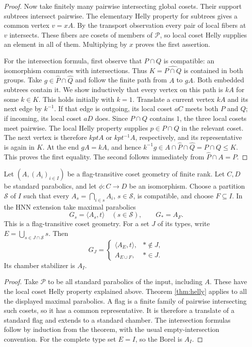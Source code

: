 \begin{proof}
Now take finitely many pairwise intersecting global cosets. Their support
subtrees intersect pairwise. The elementary Helly property for subtrees
gives a common vertex $v=xA$. By the transport observation every pair
of local fibers at $v$ intersects. These fibers are cosets of members
of $\mathcal P$, so local coset Helly supplies an element in all of
them. Multiplying by $x$ proves the first assertion.

For the intersection formula, first observe that $P\cap Q$ is compatible:
an isomorphism commutes with intersections. Thus
$K=\widehat{P\cap Q}$ is contained in both groups. Take
$g\in\widehat P\cap\widehat Q$ and follow the finite path from $A$
to $gA$. Both embedded subtrees contain it. We show inductively that
every vertex on this path is $kA$ for some $k\in K$.
This holds initially with $k=1$. Translate a current vertex $kA$ and
its next edge by $k^{-1}$. If that edge is outgoing, its local coset
$aC$ meets both $P$ and $Q$; if incoming, its local coset $aD$ does.
Since $P\cap Q$ contains $1$, the three local cosets meet pairwise.
The local Helly property supplies $p\in P\cap Q$ in the relevant
coset. The next vertex is therefore $kp tA$ or $kp t^{-1}A$,
respectively, and its representative is again in $K$.
At the end $gA=kA$, and hence
$k^{-1}g\in A\cap\widehat P\cap\widehat Q=P\cap Q\leq K$.
This proves the first equality. The second follows immediately from
$\widehat P\cap A=P$.
\end{proof}

\begin{corollary}\label{cor:geometry}
Let $(A,(A_i)_{i\in I})$ be a flag-transitive coset geometry of finite
rank. Let $C,D$ be standard parabolics, and let $\phi:C\to D$ be an
isomorphism. Choose a partition $\mathcal S$ of $I$ such that every
$A_s=\bigcap_{i\in s}A_i$, $s\in\mathcal S$, is compatible, and choose
$F\subseteq I$. In the HNN extension take maximal parabolics
\[
 G_s=\langle A_s,t\rangle\quad(s\in\mathcal S),\qquad
 G_*=A_F.
\]
This is a flag-transitive coset geometry. For a set $J$ of its types,
write $E=\bigcup_{s\in J\cap\mathcal S}s$. Then
\[
 G_J=
 \begin{cases}
   \langle A_E,t\rangle,&*\notin J,\\
   A_{E\cup F},&*\in J.
 \end{cases}
\]
Its chamber stabilizer is $A_I$.
\end{corollary}
\begin{proof}
Take $\mathcal P$ to be all standard parabolics of the input, including
$A$. These have the local coset Helly property explained above. Theorem
\ref{thm:helly} applies to all the displayed maximal parabolics. A flag
is a finite family of pairwise intersecting such cosets, so it has a
common representative. It is therefore a translate of a standard flag
and extends to a standard chamber. The intersection formulas follow
by induction from the theorem, with the usual empty-intersection convention.
For the complete type set $E=I$, so the Borel is $A_I$.
\end{proof}

